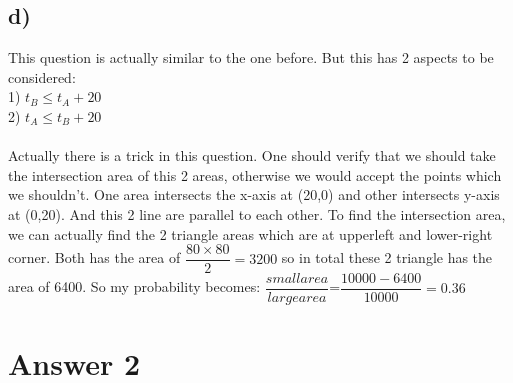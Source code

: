 \documentclass[12pt]{article}
\begin{document}
\subsection*{d)} 
This question is actually similar to the one before. But this has 2 aspects to be considered:\\
1) $t_B\leq t_A+20$\\
2) $t_A\leq t_B+20$\\\\
Actually there is a trick in this question. One should verify that we should take the intersection area of this 2 areas, otherwise we would accept the points which we shouldn't. One area intersects the x-axis at (20,0) and other intersects y-axis at (0,20). And this 2 line are parallel to each other. To find the intersection area, we can actually find the 2 triangle areas which are at upperleft and lower-right corner. Both has the area of $\dfrac{80\times80}{2}=3200$ so in total these 2 triangle has the area of 6400. So my probability becomes: $\dfrac{smallarea}{largearea}$=$\dfrac{10000-6400}{10000}=0.36$


\section*{Answer 2}
\end{document}
